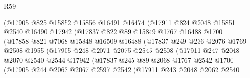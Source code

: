 \begin{lexlean}{R59}
\begin{coremodule}
                        (@17905
                          @825
                          @15852
                          @15856
                          @16491
                          @16474
                          (@17911
                            @824
                            @2048
                            @15851
                            @2540
                            @16490
                            @17942
                            (@17837
                              @822
                              @89
                              @15849
                              @1767
                              @16488
                              @1700
                              (@17858
                                @821
                                @7068
                                @15848
                                @16509
                                @16488
                                (@17837
                                  @249
                                  @236
                                  @2076
                                  @1769
                                  @2508
                                  @1955
                                  (@17905
                                    @248
                                    @2071
                                    @2075
                                    @2545
                                    @2508
                                    (@17911
                                      @247
                                      @2048
                                      @2070
                                      @2540
                                      @2544
                                      @17942
                                      (@17837
                                        @245
                                        @89
                                        @2068
                                        @1767
                                        @2542
                                        @1700
                                        (@17905
                                          @244
                                          @2063
                                          @2067
                                          @2597
                                          @2542
                                          (@17911
                                            @243
                                            @2048
                                            @2062
                                            @2540

\end{coremodule}
\end{lexlean}
